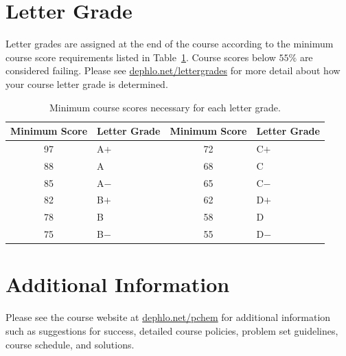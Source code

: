 \documentclass[letterpaper,oneside,onecolumn,11pt,article]{memoir}
\begin{document}
\section{Letter Grade}
Letter grades are assigned at the end of the course according to the minimum course score requirements listed in Table~\ref{tab:lettergrades}. Course scores below $55\%$ are considered failing. Please see \href{http://dephlo.net/lettergrades}{dephlo.net/lettergrades} for more detail about how your course letter grade is determined. 
\begin{table}[h]
\caption{\sffamily Minimum course scores necessary for each letter grade.}
\label{tab:lettergrades}
\begin{tabular}{cl||cl} \toprule
\textbf{Minimum Score} & \textbf{Letter Grade} & \textbf{Minimum Score} & \textbf{Letter Grade} \\ \hline
97 & \hspace{0.3in}A$+$ & 72 & \hspace{0.3in}C$+$ \\
88 & \hspace{0.3in}A & 68 & \hspace{0.3in}C \\
85 & \hspace{0.3in}A$-$ & 65 & \hspace{0.3in}C$-$ \\
82 & \hspace{0.3in}B$+$ & 62 & \hspace{0.3in}D$+$ \\
78 & \hspace{0.3in}B & 58 & \hspace{0.3in}D \\
75 & \hspace{0.3in}B$-$ & 55 & \hspace{0.3in}D$-$ \\
\bottomrule
\end{tabular}
\end{table}
%
%
\section{Additional Information}
Please see the course website at \href{http://dephlo.net/pchem}{dephlo.net/pchem} for additional information such as suggestions for success, detailed course policies, problem set guidelines, course schedule, and solutions. 
%
%
\end{document}
